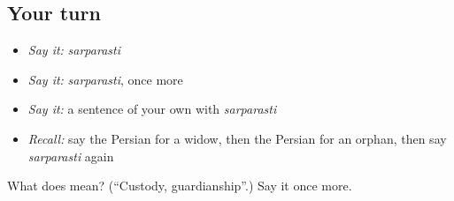 \subsection*{Your turn}
\begin{itemize}
\raggedright
  \item \emph{Say it:} \emph{sarparasti}
  \item \emph{Say it:} \emph{sarparasti}, once more
  \item \emph{Say it:} a sentence of your own with \emph{sarparasti}
  \item \emph{Recall:} say the Persian for a widow, then the Persian for an orphan, then say \emph{sarparasti} again
\end{itemize}

\begin{tcolorbox}[breakable,colback=teal!4,colframe=teal!35!black,title={Before you move on}]
What does  mean? (\textquotedblleft{}Custody, guardianship\textquotedblright{}.) Say it once more.
\end{tcolorbox}
